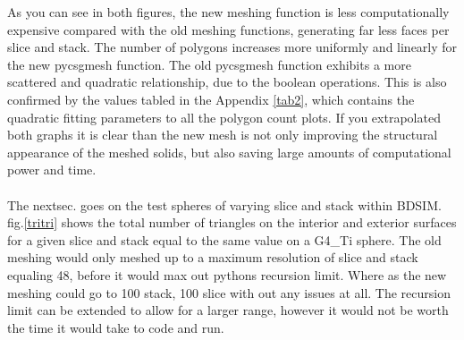 \documentclass[12pt,a4paper]{article}
\begin{document}
\newpage
\noindent As you can see in both figures, the new meshing function is less computationally expensive compared with the old meshing functions, generating far less faces per slice and stack. The number of polygons increases more uniformly and linearly for the new pycsgmesh function. The old pycsgmesh function exhibits a more scattered and quadratic relationship, due to the boolean operations. This is also confirmed by the values tabled in the Appendix \ref{tab2}, which contains the quadratic fitting parameters to all the polygon count plots. If you extrapolated both graphs it is clear than the new mesh is not only improving the structural appearance of the meshed solids, but also saving large amounts of computational power and time.
\\\\
\label{recur}
\noindent The nextsec. goes on the test spheres of varying slice and stack within BDSIM. fig.\ref{tritri} shows the total number of triangles on the interior and exterior surfaces for a given slice and stack equal to the same value on a G4\_Ti sphere. The old meshing would only meshed up to a maximum resolution of slice and stack equaling 48, before it would max out pythons recursion limit. Where as the new meshing could go to 100 stack, 100 slice with out any issues at all. The recursion limit can be extended to allow for a larger range, however it would not be worth the time it would take to code and run.
\end{document}
